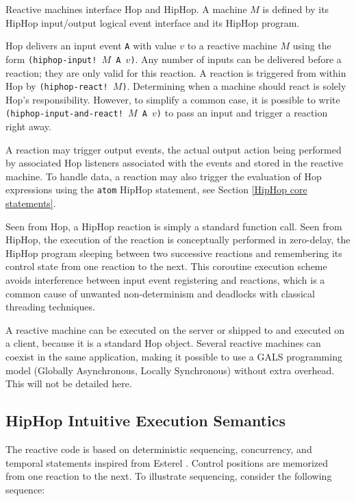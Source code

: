\documentclass{llncs}
\begin{document}
Reactive machines interface Hop and HipHop. A machine $M$
is defined by its HipHop input/output logical event interface and its
HipHop program. 

Hop delivers an input event {\texttt{A}} with value $v$ to a reactive machine $M$ 
using the form {\texttt{(hiphop-input! $M$ A $v$)}}. Any number of inputs can be delivered
before a reaction; they are only valid for this reaction.
A reaction is triggered from within Hop by
{\texttt{(hiphop-react! $M$)}}. Determining when a machine should react is
solely Hop's responsibility. However, to simplify a common case,
it is possible to write {\texttt{(hiphop-input-and-react! $M$ A
$v$)}} to pass an input and trigger a reaction right away.

A reaction may trigger output events, the actual output action being
performed by associated Hop listeners associated with the events and
stored in the reactive machine. To handle data, a reaction may also
trigger the evaluation of Hop expressions using the
{\texttt{atom{}}} HipHop statement, see Section \ref{HipHop core
  statements}.

Seen from Hop, a HipHop reaction is simply a standard function
call. Seen from HipHop, the execution of the reaction is conceptually
performed in zero-delay, the HipHop program sleeping between two
successive reactions and remembering its control state from one reaction to the next.
This coroutine execution
scheme avoids interference between input event registering and
reactions, which is a common cause of unwanted non-determinism and
deadlocks with classical threading techniques.

A reactive machine can be executed on the server or
shipped to and executed on a client, because it is a standard Hop
object. Several reactive machines can coexist in the
same application, making it possible to use a GALS programming model
(Globally Asynchronous, Locally Synchronous) without extra overhead.
This will not be detailed here.

\subsection{HipHop Intuitive Execution Semantics}
\label{HipHop Intuitive Execution Semantics}

The reactive code is based on deterministic sequencing,
concurrency, and temporal statements inspired from Esterel
\cite{berry2000foundations}. Control positions are memorized from one
reaction to the next. To illustrate sequencing, consider the following sequence:
\end{document}
